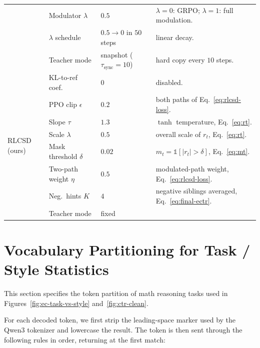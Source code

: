 \begin{table}[t]
{\begin{tabular}{llll}
    & Modulator $\lambda$    & $0.5$     & $\lambda{=}0$: GRPO; $\lambda{=}1$: full modulation. \\
    & $\lambda$ schedule     & $0.5\!\to\!0$ in $50$ steps & linear decay. \\
    & Teacher mode           & snapshot ($\tau_{\text{sync}}{=}10$) & hard copy every $10$ steps. \\
  \midrule
  \multirow{8}{*}{RLCSD (ours)}
    & KL-to-ref coef.        & $0$      & disabled. \\
    & PPO clip $\epsilon$    & $0.2$    & both paths of Eq.~\ref{eq:rlcsd-loss}. \\
    & Slope $\tau$           & $1.3$   & $\tanh$ temperature, Eq.~\ref{eq:rt}. \\
    & Scale $\lambda$        & $0.5$    & overall scale of $r_t$, Eq.~\ref{eq:rt}. \\
    & Mask threshold $\delta$ & $0.02$  & $m_t{=}\mathbb{1}[|r_t|{>}\delta]$, Eq.~\ref{eq:mt}. \\
    & Two-path weight $\eta$  & $0.5$   & modulated-path weight, Eq.~\ref{eq:rlcsd-loss}. \\
    & Neg.\ hints $K$         & $4$     & negative siblings averaged, Eq.~\ref{eq:final-ectr}. \\
    & Teacher mode            & fixed \\
  \bottomrule
  \end{tabular}}
  \end{table}

\section{Vocabulary Partitioning for Task / Style Statistics}
  \label{app:vocab-split}

  This section specifies the token partition of math reasoning tasks used
  in Figures~\ref{fig:ec-task-vs-style} and~\ref{fig:ctr-clean}.

  For each decoded token, we first strip the leading-space marker used by
  the Qwen3 tokenizer and lowercase the result. The token is then sent
  through the following rules in order, returning at the first match:

